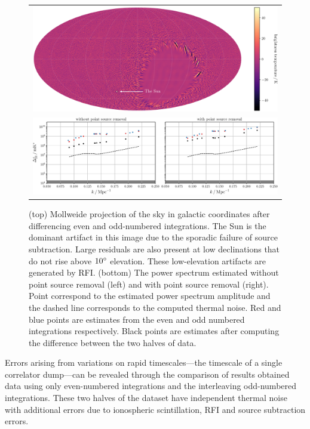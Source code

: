 \documentclass[twocolumn]{aastex62}
\begin{document}
\begin{figure}
    \centering
    \begin{tabular}{c}
        \includegraphics[width=\textwidth]{even-odd-sky-map-colorbar}\\
        \includegraphics[width=\textwidth]{spherical-power-spectrum-even-odd}\\
    \end{tabular}
    \caption{
        (top) Mollweide projection of the sky in galactic coordinates after differencing even and
        odd-numbered integrations. The Sun is the dominant artifact in this image due to the
        sporadic failure of source subtraction. Large residuals are also present at low declinations
        that do not rise above $10\mbox{$^\circ$}$ elevation. These low-elevation artifacts are generated by
        RFI.
        (bottom) The power spectrum estimated without point source removal (left) and with point
        source removal (right). Point correspond to the estimated power spectrum amplitude and the
        dashed line corresponds to the computed thermal noise. Red and blue points are estimates
        from the even and odd numbered integrations respectively. Black points are estimates after
        computing the difference between the two halves of data.
    }
    \label{fig:spherical-power-spectra-even-odd}
\end{figure}

Errors arising from variations on rapid timescales---the timescale of a single correlator dump---can
be revealed through the comparison of results obtained data using only even-numbered integrations
and the interleaving odd-numbered integrations. These two halves of the dataset have independent
thermal noise with additional errors due to ionospheric scintillation, RFI and source subtraction
errors.
\end{document}
